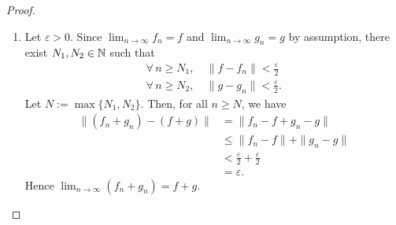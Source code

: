 \iffalse
\begin{proof}
\begin{enumerate}[label=(\roman*)]
\item Let $\varepsilon >0$. Since $\displaystyle \lim_{n\to \infty}f_n=f$ and $\displaystyle \lim_{n\to \infty}g_n=g$ by assumption, there exist $N_1,N_2\in \mathbb{N}$ such that
\begin{align*}
  \forall \, n\geq N_1, & \ \|f-f_n\|<\tfrac{\varepsilon}{2}\phantom{.}\\
  \forall \, n\geq N_2, & \ \|g-g_n\|<\tfrac{\varepsilon}{2}.
\end{align*}
Let $N:=\max\{N_1,N_2\}$. Then, for all $n\geq N$, we have
\begin{align*}
\|(f_n+g_n)-(f+g)\|
&= \|f_n-f+g_n-g\|\\
&\leq \|f_n-f\|+\|g_n-g\|\\
& < \tfrac{\varepsilon}{2}+\tfrac{\varepsilon}{2}\\
& = \varepsilon.
\end{align*}
Hence $\displaystyle \lim_{n\to \infty}(f_n+g_n)=f+g$.



\end{enumerate}
\end{proof}
